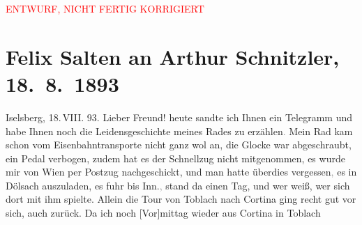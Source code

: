 
\begin{center}
            \textcolor{red}{ENTWURF, NICHT FERTIG KORRIGIERT}
                      \end{center}
            
         
         \renewcommand{\erwaehntePersonen}{Personen: Franz Defregger, Marie Glümer, Sophie Link, Michael Emil Salzmann, Philipp Salzmann, Theodor Salzmann, Hermine von Schaffgotsch}
         \renewcommand{\erwaehnteOrte}{Orte: Ampezzo, Cortina d'Ampezzo, Dölsach, Großglockner, Heiligenblut am Großglockner, Innichen, Iselsberg, Kaiser-Franz-Josefs-Höhe, Lienz, Mittewald an der Drau, Pasterze Glacier, Toblach, Wien}
         \renewcommand{\erwaehnteWerke}{}
               \section[Felix Salten an Arthur Schnitzler, 18. 8. 1893]{ Felix Salten an Arthur Schnitzler, 18. 8. 1893}\nopagebreak{}\rehead{ }\begin{ledgroupsized}[t]{13cm}\normalsize\beginnumbering \toendnotes[C]{\smallbreak\pagebreak[2]} 
\toendnotes[C]{\smallbreak}\pstart
           \raggedleft{}{\pb}Iselsberg, 18. VIII.
                  93.\pend
           \pstart
           Lieber Freund! heute sandte ich Ihnen ein Telegramm und habe Ihnen
               noch die Leidensgeschichte meines Rades zu erzählen\textcolor{gray}{.} Mein Rad kam
               schon vom Eisenbahntransporte nicht ganz wol an, die Glocke war abgeschraubt, ein
               Pedal verbogen, zudem hat es der Schnellzug nicht mitgenommen, es wurde mir von Wien per Postzug nachgeschickt, und man hatte
               überdies vergessen\textcolor{gray}{,} es in Dölsach auszuladen, es fuhr bis Inn.\textcolor{gray}{,} stand da einen Tag, und wer weiß, wer sich dort mit
               ihm spielte. Allein die Tour von Toblach nach Cortina ging recht gut vor sich, auch zurück. Da
               ich noch {[}Vor{]}mittag wieder aus Cortina in Toblach

\end{ledgroupsized}
